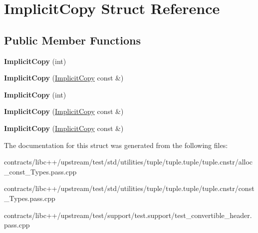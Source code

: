 \hypertarget{struct_implicit_copy}{}\section{Implicit\+Copy Struct Reference}
\label{struct_implicit_copy}
\subsection*{Public Member Functions}
\begin{DoxyCompactItemize}
\item 
\mbox{\label{struct_implicit_copy_a6f9ae6ebbeef565733ecb3ed07438c98}} 
{\bfseries Implicit\+Copy} (int)
\item 
\mbox{\label{struct_implicit_copy_a5a528e288d1409884bd7814739e25da8}} 
{\bfseries Implicit\+Copy} (\mbox{\hyperlink{struct_implicit_copy}{Implicit\+Copy}} const \&)
\item 
\mbox{\label{struct_implicit_copy_a6f9ae6ebbeef565733ecb3ed07438c98}} 
{\bfseries Implicit\+Copy} (int)
\item 
\mbox{\label{struct_implicit_copy_a5a528e288d1409884bd7814739e25da8}} 
{\bfseries Implicit\+Copy} (\mbox{\hyperlink{struct_implicit_copy}{Implicit\+Copy}} const \&)
\item 
\mbox{\label{struct_implicit_copy_a5a528e288d1409884bd7814739e25da8}} 
{\bfseries Implicit\+Copy} (\mbox{\hyperlink{struct_implicit_copy}{Implicit\+Copy}} const \&)
\end{DoxyCompactItemize}


The documentation for this struct was generated from the following files\+:\begin{DoxyCompactItemize}
\item 
contracts/libc++/upstream/test/std/utilities/tuple/tuple.\+tuple/tuple.\+cnstr/alloc\+\_\+const\+\_\+\+Types.\+pass.\+cpp\item 
contracts/libc++/upstream/test/std/utilities/tuple/tuple.\+tuple/tuple.\+cnstr/const\+\_\+\+Types.\+pass.\+cpp\item 
contracts/libc++/upstream/test/support/test.\+support/test\+\_\+convertible\+\_\+header.\+pass.\+cpp\end{DoxyCompactItemize}
